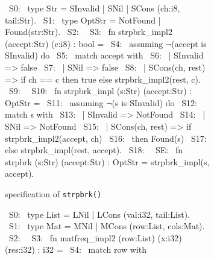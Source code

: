 \begin{figure}[H]\ContinuedFloat
\captionsetup[]{skip=-7pt}
\captionsetup[subfigure]{skip=-7pt}
\begin{subfigure}[b]{\textwidth}
\begin{center}
\begin{allLangEnvFoot}
~{\tiny \textcolor{mygray}{S0:\phantom{ }}}~ type Str = SInvalid | SNil | SCons (ch:i8, tail:Str).
~{\tiny \textcolor{mygray}{S1:\phantom{ }}}~ type OptStr = NotFound | Found(str:Str).
~{\tiny \textcolor{mygray}{S2:\phantom{ }}}~ 
~{\tiny \textcolor{mygray}{S3:\phantom{ }}}~ fn strpbrk_impl2 (accept:Str) (c:i8) : bool =
~{\tiny \textcolor{mygray}{S4:\phantom{ }}}~   assuming $\neg$(accept is SInvalid) do
~{\tiny \textcolor{mygray}{S5:\phantom{ }}}~   match accept with
~{\tiny \textcolor{mygray}{S6:\phantom{ }}}~   | SInvalid => false
~{\tiny \textcolor{mygray}{S7:\phantom{ }}}~   | SNil => false
~{\tiny \textcolor{mygray}{S8:\phantom{ }}}~   | SCons(ch, rest) => if ch == c then true else strpbrk_impl2(rest, c).
~{\tiny \textcolor{mygray}{S9:\phantom{ }}}~ 
~{\tiny \textcolor{mygray}{S10:}}~ fn strpbrk_impl (s:Str) (accept:Str) : OptStr =
~{\tiny \textcolor{mygray}{S11:}}~   assuming $\neg$(s is SInvalid) do
~{\tiny \textcolor{mygray}{S12:}}~   match s with
~{\tiny \textcolor{mygray}{S13:}}~   | SInvalid => NotFound
~{\tiny \textcolor{mygray}{S14:}}~   | SNil => NotFound
~{\tiny \textcolor{mygray}{S15:}}~   | SCons(ch, rest) => if strpbrk_impl2(accept, ch)
~{\tiny \textcolor{mygray}{S16:}}~                        then Found(s)
~{\tiny \textcolor{mygray}{S17:}}~                        else strpbrk_impl(rest, accept).
~{\tiny \textcolor{mygray}{S18:}}~ 
~{\tiny \textcolor{mygray}{SE:\phantom{ }}}~ fn strpbrk (s:Str) (accept:Str) : OptStr = strpbrk_impl(s, accept).
\end{allLangEnvFoot}
\end{center}
\caption{\SpecL{} specification of {\tt strpbrk()}}
\end{subfigure}
\begin{subfigure}[b]{\textwidth}
\begin{center}
\begin{allLangEnvFoot}
~{\tiny \textcolor{mygray}{S0:\phantom{ }}}~ type List = LNil | LCons (val:i32, tail:List).
~{\tiny \textcolor{mygray}{S1:\phantom{ }}}~ type Mat = MNil | MCons (row:List, cols:Mat).
~{\tiny \textcolor{mygray}{S2:\phantom{ }}}~ 
~{\tiny \textcolor{mygray}{S3:\phantom{ }}}~ fn matfreq_impl2 (row:List) (x:i32) (res:i32) : i32 =
~{\tiny \textcolor{mygray}{S4:\phantom{ }}}~   match row with

\end{allLangEnvFoot}
\end{center}
\end{subfigure}
\end{figure}
